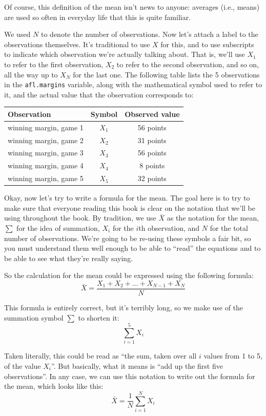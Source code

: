 \documentclass[
]{book}
\theoremstyle{definition}
\theoremstyle{definition}
\theoremstyle{definition}
\theoremstyle{definition}
\theoremstyle{remark}
\begin{document}
Of course, this definition of the mean isn't news to anyone: averages (i.e., means) are used so often in everyday life that this is quite familiar.

We used \(N\) to denote the number of observations. Now let's attach a label to the observations themselves. It's traditional to use \(X\) for this, and to use subscripts to indicate which observation we're actually talking about. That is, we'll use \(X_1\) to refer to the first observation, \(X_2\) to refer to the second observation, and so on, all the way up to \(X_N\) for the last one. The following table lists the 5 observations in the \texttt{afl.margins} variable, along with the mathematical symbol used to refer to it, and the actual value that the observation corresponds to:

\begin{longtable}[]{@{}lcc@{}}
\toprule()
Observation & Symbol & Observed value \\
\midrule()
\endhead
winning margin, game 1 & \(X_1\) & 56 points \\
winning margin, game 2 & \(X_2\) & 31 points \\
winning margin, game 3 & \(X_3\) & 56 points \\
winning margin, game 4 & \(X_4\) & 8 points \\
winning margin, game 5 & \(X_5\) & 32 points \\
\bottomrule()
\end{longtable}

Okay, now let's try to write a formula for the mean. The goal here is to try to make sure that everyone reading this book is clear on the notation that we'll be using throughout the book. By tradition, we use \(\bar{X}\) as the notation for the mean, \(\scriptstyle\sum\) for the idea of summation, \(X_i\) for the \(i\)th observation, and \(N\) for the total number of observations. We're going to be re-using these symbols a fair bit, so you must understand them well enough to be able to ``read'' the equations and to be able to see what they're really saying.

So the calculation for the mean could be expressed using the following formula:
\[
\bar{X} = \frac{X_1 + X_2 + ... + X_{N-1} + X_N}{N}
\]

This formula is entirely correct, but it's terribly long, so we make use of the summation symbol \(\scriptstyle\sum\) to shorten it:
\[
\sum_{i=1}^5 X_i
\]

Taken literally, this could be read as ``the sum, taken over all \(i\) values from 1 to 5, of the value \(X_i\)''. But basically, what it means is ``add up the first five observations''. In any case, we can use this notation to write out the formula for the mean, which looks like this:
\[
\bar{X} = \frac{1}{N} \sum_{i=1}^N X_i 
\]
\end{document}
